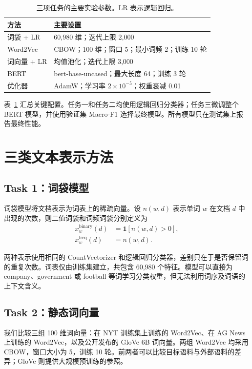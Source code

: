 \documentclass[11pt]{article}
\begin{document}
\begin{table}[t]
\centering\small
\begin{tabular}{@{}p{}p{}@{}}
\toprule
方法 & 主要设置\\
\midrule
词袋 + LR & 60,980 维；迭代上限 2,000\\
Word2Vec & CBOW；100 维；窗口 5；最小词频 2；训练 10 轮\\
词向量 + LR & 均值池化；迭代上限 3,000\\
BERT & bert-base-uncased；最大长度 64；训练 3 轮\\
优化器 & AdamW；学习率 $2\times10^{-5}$；权重衰减 0.01\\
\bottomrule
\end{tabular}
\caption{三项任务的主要实验参数。LR 表示逻辑回归。}
\label{tab:config}
\end{table}

表~\ref{tab:config} 汇总关键配置。任务一和任务二均使用逻辑回归分类器；任务三微调整个 BERT 模型，并使用验证集 Macro-F1 选择最终模型。所有模型只在测试集上报告最终性能。

\section{三类文本表示方法}

\subsection{Task 1：词袋模型}

词袋模型将文档表示为词表上的稀疏向量。设 $n(w,d)$ 表示单词 $w$ 在文档 $d$ 中出现的次数，则二值词袋和词频词袋分别定义为
\begin{align}
x_w^{\mathrm{binary}}(d)&=\mathbf{1}[n(w,d)>0],\\
x_w^{\mathrm{freq}}(d)&=n(w,d).
\end{align}

两种表示使用相同的 CountVectorizer 和逻辑回归分类器，差别只在于是否保留词的重复次数。词表仅由训练集建立，共包含 60,980 个特征。模型可以直接为 company、government 或 football 等词学习分类权重，但无法利用词序及词语的上下文含义。

\subsection{Task 2：静态词向量}

我们比较三组 100 维词向量：在 NYT 训练集上训练的 Word2Vec、在 AG News 上训练的 Word2Vec，以及公开发布的 GloVe 6B 词向量。两组 Word2Vec 均采用 CBOW，窗口大小为 5，训练 10 轮。前两者可以比较目标语料与外部语料的差异；GloVe 则提供大规模预训练的参照\citep{mikolov2013efficient,pennington-etal-2014-glove}。
\end{document}
